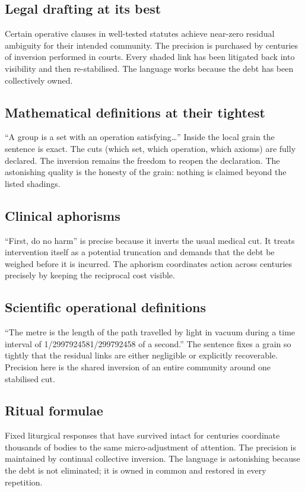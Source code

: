 \documentclass[11pt,a4paper]{article}
\begin{document}
\subsection{Legal drafting at its best} Certain operative clauses in well-tested statutes achieve near-zero residual ambiguity for their intended community. The precision is purchased by centuries of inversion performed in courts. Every shaded link has been litigated back into visibility and then re-stabilised. The language works because the debt has been collectively owned.

\subsection{Mathematical definitions at their tightest} ``A group is a set with an operation satisfying\ldots'' Inside the local grain the sentence is exact. The cuts (which set, which operation, which axioms) are fully declared. The inversion remains the freedom to reopen the declaration. The astonishing quality is the honesty of the grain: nothing is claimed beyond the listed shadings.

\subsection{Clinical aphorisms} ``First, do no harm'' is precise because it inverts the usual medical cut. It treats intervention itself as a potential truncation and demands that the debt be weighed before it is incurred. The aphorism coordinates action across centuries precisely by keeping the reciprocal cost visible.

\subsection{Scientific operational definitions} ``The metre is the length of the path travelled by light in vacuum during a time interval of 1/2997924581/299792458 of a second.'' The sentence fixes a grain so tightly that the residual links are either negligible or explicitly recoverable. Precision here is the shared inversion of an entire community around one stabilised cut.

\subsection{Ritual formulae} Fixed liturgical responses that have survived intact for centuries coordinate thousands of bodies to the same micro-adjustment of attention. The precision is maintained by continual collective inversion. The language is astonishing because the debt is not eliminated; it is owned in common and restored in every repetition.
\end{document}
